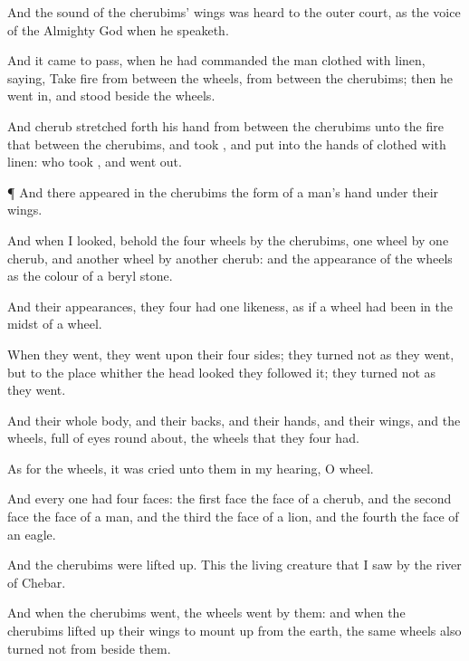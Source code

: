{And the
sound of the
cherubims’
wings was
heard
{} to the
outer
court, as the
voice of the
Almighty
God when he
speaketh.

And it came to pass,
{} when he had
commanded the
man
clothed with
linen,
saying,
Take
fire from between the
wheels, from between the
cherubims; then he went
in, and
stood
beside the
wheels.

And
{}
cherub stretched
forth his
hand from between the
cherubims unto the
fire that
{} between the
cherubims, and
took
{}, and
put
{} into the
hands of
{}
clothed with
linen: who
took
{}, and went
out.


\par }{\PP {}¶ And there
appeared in the
cherubims the
form of a
man’s
hand under their
wings.

And when I
looked, behold the
four
wheels
by the
cherubims,
one
wheel
by
one
cherub, and
another
wheel
by
another
cherub: and the
appearance of the
wheels
{} as the
colour of a
beryl
stone.

And
{} their
appearances, they
four had
one
likeness, as if a
wheel had been in the
midst of a
wheel.

When they
went, they
went upon their
four
sides; they
turned not as they
went, but to the
place whither the
head
looked they
followed it; they
turned not as they
went.

And their whole
body, and their
backs, and their
hands, and their
wings, and the
wheels,
{}
full of
eyes round
about,
{} the
wheels that they
four had.

As for the
wheels, it was
cried unto them in my
hearing, O
wheel.

And every
one had
four
faces: the
first
face
{} the
face of a
cherub, and the
second
face
{} the
face of a
man, and the
third the
face of a
lion, and the
fourth the
face of an
eagle.

And the
cherubims were lifted
up. This
{} the living
creature that I
saw by the
river of
Chebar.

And when the
cherubims
went, the
wheels
went by
them: and when the
cherubims lifted
up their
wings to mount
up from the
earth, the same
wheels
also
turned not from
beside them.

}
